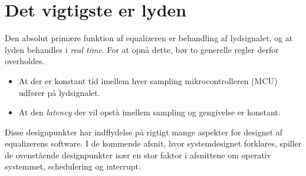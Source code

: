 \section{Det vigtigste er lyden}
Den absolut primære funktion af equalizeren er behandling af lydsignalet, og at lyden behandles i \textit{real time}.
For at opnå dette, bør to generelle regler derfor overholdes.
\begin{itemize}[noitemsep]
\item At der er konstant tid imellem hver sampling mikrocontrolleren (MCU) udfører på lydsignalet.
\item At den \textit{latency} der vil opstå imellem sampling og gengivelse er konstant.
\end{itemize}

Disse designpunkter har indflydelse på rigtigt mange aspekter for designet af equalizerens software.
I de kommende afsnit, hvor systemdesignet forklares, spiller de ovenstående designpunkter især en stor faktor i afsnittene om operativ systemmet, schedulering og interrupt.